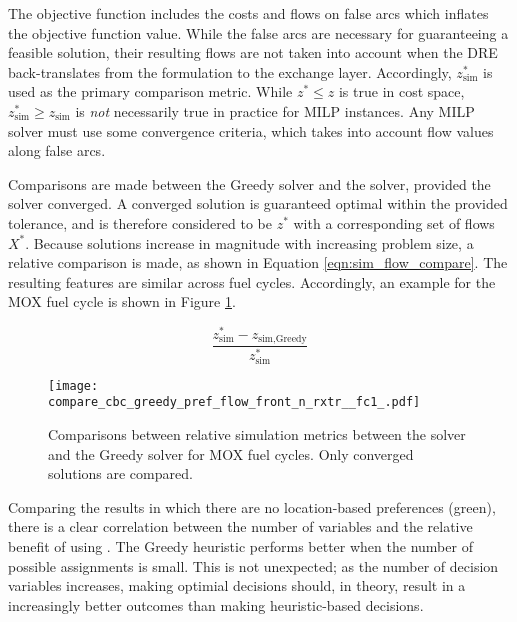 The objective function includes the costs and flows on false arcs which inflates
the objective function value. While the false arcs are necessary for
guaranteeing a feasible solution, their resulting flows are not taken into
account when the DRE back-translates from the formulation to the exchange
layer. Accordingly, $z^*_{\text{sim}}$ is used as the primary comparison
metric. While $z^* \leq z$ is true in cost space, $z^*_{\text{sim}} \geq
z_{\text{sim}}$ is \textit{not} necessarily true in practice for MILP
instances. Any MILP solver must use some convergence criteria, which takes into
account flow values along false arcs.

Comparisons are made between the Greedy solver and the \cbc solver, provided the
\cbc solver converged. A converged \cbc solution is guaranteed optimal within
the provided tolerance, and is therefore considered to be $z^*$ with a
corresponding set of flows $X^*$. Because solutions increase in magnitude with
increasing problem size, a relative comparison is made, as shown in Equation
\ref{eqn:sim_flow_compare}. The resulting features are similar across fuel
cycles. Accordingly, an example for the MOX fuel cycle is shown in Figure
\ref{fig:compare_cbc_greedy_pref_flow_front_n_rxtr__fc1_}.

\begin{equation}\label{eqn:sim_flow_compare}
\frac{z^*_{\text{sim}} - z_{\text{sim}, \text{Greedy}}}
     {z^*_{\text{sim}}} 
\end{equation}

\begin{figure}[h!]
  \begin{center}
    \texttt{[image: compare\_cbc\_greedy\_pref\_flow\_front\_n\_rxtr\_\_fc1\_.pdf]}
    \caption{
      \label{fig:compare_cbc_greedy_pref_flow_front_n_rxtr__fc1_}
      Comparisons between relative simulation metrics between the \cbc solver and
      the Greedy solver for MOX fuel cycles. Only converged \cbc
      solutions are compared.  }
  \end{center}
\end{figure}

Comparing the results in which there are no location-based preferences (green),
there is a clear correlation between the number of variables and the relative
benefit of using \cbc. The Greedy heuristic performs better when the number of
possible assignments is small. This is not unexpected; as the number of decision
variables increases, making optimial decisions should, in theory, result in a
increasingly better outcomes than making heuristic-based decisions. 

